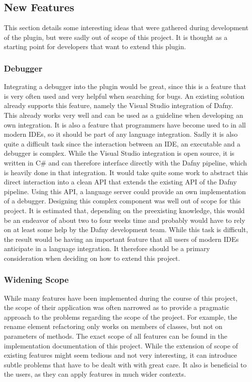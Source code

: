 \subsection{New Features} \label{featureExtensions}
This section details some interesting ideas that were gathered during development of the plugin, but were sadly out of scope of this project. It is thought as a starting point for developers that want to extend this plugin. 
\subsubsection{Debugger}
Integrating a debugger into the plugin would be great, since this is a feature that is very often used and very helpful when searching for bugs. An existing solution already supports this feature, namely the Visual Studio integration \cite{visualstudiodafny} of Dafny. This already works very well and can be used as a guideline when developing an own integration. It is also a feature that programmers have become used to in all modern IDEs, so it should be part of any language integration. \newline
Sadly it is also quite a difficult task since the interaction between an IDE, an executable and a debugger is complex. While the Visual Studio integration is open source, it is written in C\# and can therefore interface directly with the Dafny pipeline, which is heavily done in that integration. It would take quite some work to abstract this direct interaction into a clean API that extends the existing API of the Dafny pipeline. Using this API, a language server could provide an own implementation of a debugger.\newline
Designing this complex component was well out of scope for this project. It is estimated that, depending on the preexisting knowledge, this would be an endeavor of about two to four weeks time and probably would have to rely on at least some help by the Dafny development team. While this task is difficult, the result would be having an important feature that all users of modern IDEs anticipate in a language integration. It therefore should be a primary consideration when deciding on how to extend this project. 
\subsubsection{Widening Scope}
While many features have been implemented during the course of this project, the scope of their application was often narrowed as to provide a pragmatic approach to the problems regarding the scope of the project. For example, the rename element refactoring only works on members of classes, but not on parameters of methods. \newline
The exact scope of all features can be found in the implementation documentation of this project. While the extension of scope of existing features might seem tedious and not very interesting, it can introduce subtle problems that have to be dealt with with great care. It also is beneficial to the users, as they can apply features in much wider contexts. 
